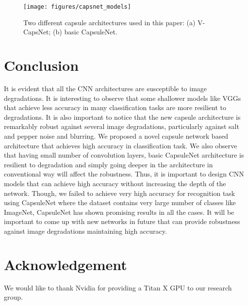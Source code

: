 \documentclass[10pt, journal, compsoc]{IEEEtran}
\begin{document}
\begin{figure*}
\texttt{[image: figures/capsnet\_models]}
\caption{Two different capsule architectures used in this paper: (a) V-CapsNet; (b) basic CapsuleNet.}
\label{fig:capsnet_models}
\end{figure*}

\section{Conclusion}
It is evident that all the CNN architectures are susceptible to image degradations. It is interesting to observe that some shallower models like VGGs that achieve less accuracy in many classification tasks are more resilient to degradations. It is also important to notice that the new capsule architecture is remarkably robust against several image degradations, particularly against salt and pepper noise and blurring. We proposed a novel capsule network based architecture that achieves high accuracy in classification task. We also observe that having small number of convolution layers, basic CapsuleNet architecture is resilient to degradation and simply going deeper in the architecture in conventional way will affect the robustness. Thus, it is important to design CNN models that can achieve high accuracy without increasing the depth of the network. Though, we failed to achieve very high accuracy for recognition task using CapsuleNet where the dataset contains very large number of classes like ImageNet, CapsuleNet has shown promising results in all the cases. It will be important to come up with new networks in future that can provide robustness against image degradations maintaining high accuracy.

\section{Acknowledgement}
We would like to thank Nvidia\textsuperscript{\textregistered} for providing a Titan X GPU to our research group.



\end{document}
